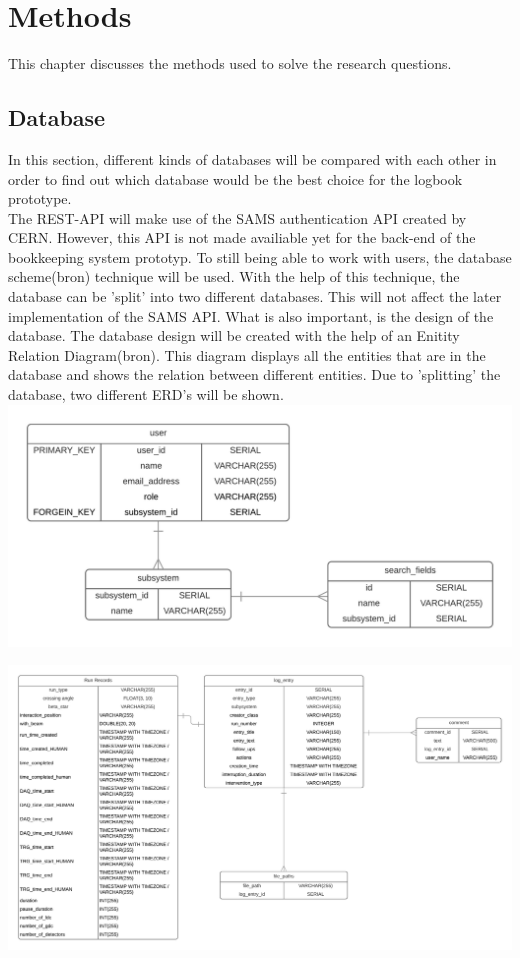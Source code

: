 \documentclass[paper=a4, fontsize=11pt,twoside]{scrartcl}	%
\begin{document}
\newpage


\section{Methods}
This chapter discusses the methods used to solve the research questions.
\subsection{Database}
In this section, different kinds of databases will be compared with each other in order to find out which database would be the best choice for the logbook prototype. \\
The REST-API will make use of the SAMS authentication API created by CERN. However, this API is not made availiable yet for the back-end of the bookkeeping system prototyp. To still being able to work with users, the database scheme(bron) technique will be used. With the help of this technique, the database can be 'split' into two different databases. This will not affect the later implementation of the SAMS API.
What is also important, is the design of the database. The database design will be created with the help of an Enitity Relation Diagram(bron). This diagram displays all the entities that are in the database and shows the relation between different entities. Due to 'splitting' the database, two different ERD's will be shown. \\
\includegraphics[scale=1]{ERDUser}

\includegraphics[scale=0.5]{ERDLogEntry}
\end{document}
